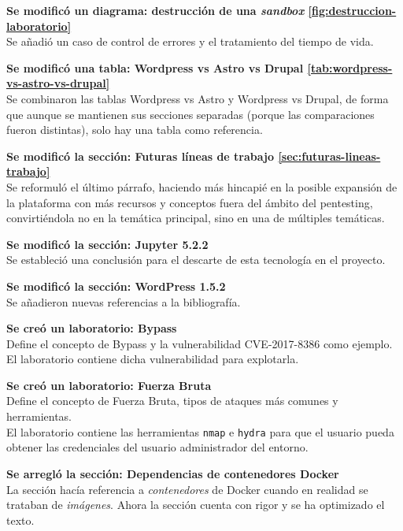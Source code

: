         \textbf{Se modificó un diagrama: destrucción de una \textit{sandbox} \ref{fig:destruccion-laboratorio}} \\
        Se añadió un caso de control de errores y el tratamiento del tiempo de vida.

        \textbf{Se modificó una tabla: Wordpress vs Astro vs Drupal \ref{tab:wordpress-vs-astro-vs-drupal}} \\
        Se combinaron las tablas Wordpress vs Astro y Wordpress vs Drupal, de forma que aunque se mantienen sus secciones separadas (porque las comparaciones fueron distintas), solo hay una tabla como referencia.

        \textbf{Se modificó la sección: Futuras líneas de trabajo \ref{sec:futuras-lineas-trabajo}} \\
        Se reformuló el último párrafo, haciendo más hincapié en la posible expansión de la plataforma con más recursos y conceptos fuera del ámbito del pentesting, convirtiéndola no en la temática principal, sino en una de múltiples temáticas.

        \textbf{Se modificó la sección: Jupyter 5.2.2} \\
        Se estableció una conclusión para el descarte de esta tecnología en el proyecto.

        \textbf{Se modificó la sección: WordPress 1.5.2} \\
        Se añadieron nuevas referencias a la bibliografía.

        \textbf{Se creó un laboratorio: Bypass} \\
        Define el concepto de Bypass y la vulnerabilidad CVE-2017-8386 como ejemplo. \\
        El laboratorio contiene dicha vulnerabilidad para explotarla.
        
        \textbf{Se creó un laboratorio: Fuerza Bruta} \\
        Define el concepto de Fuerza Bruta, tipos de ataques más comunes y herramientas. \\
        El laboratorio contiene las herramientas \texttt{nmap} e \texttt{hydra} para que el usuario pueda obtener las credenciales del usuario administrador del entorno.
        
        \textbf{Se arregló la sección: Dependencias de contenedores Docker} \\
        La sección hacía referencia a \textit{contenedores} de Docker cuando en realidad se trataban de \textit{imágenes}. Ahora la sección cuenta con rigor y se ha optimizado el texto.


